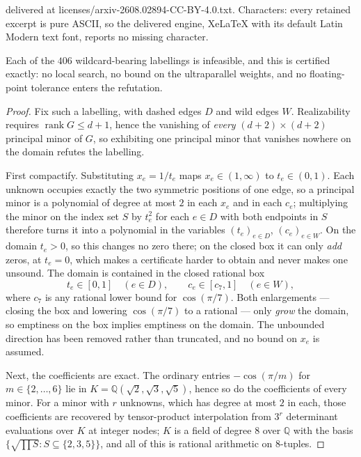 \documentclass[10pt,a4paper]{amsart}
\DeclareMathOperator{\rank}{rank}
\newcommand{\Gr}{G}
\newcommand{\NumWild}{406}
\newcommand{\QQ}{\mathbb{Q}}
\begin{document}
delivered at licenses/arxiv-2608.02894-CC-BY-4.0.txt. Characters: every retained excerpt is pure ASCII, so the delivered engine, XeLaTeX with its default Latin Modern text font, reports no missing character.
\begin{proposition}
\label{prop:wildexact}
Each of the $\NumWild$ wildcard-bearing labellings is infeasible, and this is
certified exactly: no local search, no bound on the ultraparallel weights, and no
floating-point tolerance enters the refutation.
\end{proposition}

\begin{proof}
Fix such a labelling, with dashed edges $D$ and wild edges $W$. Realizability
requires $\rank\Gr\le d+1$, hence the vanishing of \emph{every} $(d+2)\times(d+2)$
principal minor of $\Gr$, so exhibiting one principal minor that vanishes nowhere
on the domain refutes the labelling.

First compactify. Substituting $x_e = 1/t_e$ maps $x_e\in(1,\infty)$ to
$t_e\in(0,1)$. Each unknown occupies exactly the two symmetric positions of one
edge, so a principal minor is a polynomial of degree at most $2$ in each $x_e$ and
in each $c_e$; multiplying the minor on the index set $S$ by $t_e^{2}$ for each
$e\in D$ with both endpoints in $S$ therefore turns it into a polynomial in the
variables $(t_e)_{e\in D}$, $(c_e)_{e\in W}$. On the domain $t_e>0$, so this
changes no zero there; on the closed box it can only \emph{add} zeros, at
$t_e=0$, which makes a certificate harder to obtain and never makes one unsound.
The domain is contained in the closed rational box
\[
t_e\in[0,1]\quad(e\in D),\qquad c_e\in[c_7,1]\quad(e\in W),
\]
where $c_7$ is any rational lower bound for $\cos(\pi/7)$. Both enlargements ---
closing the box and lowering $\cos(\pi/7)$ to a rational --- only \emph{grow} the
domain, so emptiness on the box implies emptiness on the domain. The unbounded
direction has been removed rather than truncated, and no bound on $x_e$ is
assumed.

Next, the coefficients are exact. The ordinary entries $-\cos(\pi/m)$ for
$m\in\{2,\dots,6\}$ lie in $K=\QQ(\sqrt2,\sqrt3,\sqrt5)$, hence so do the
coefficients of every minor. For a minor with $r$ unknowns, which has degree at
most $2$ in each, those coefficients are recovered by tensor-product interpolation
from $3^{r}$ determinant evaluations over $K$ at integer nodes; $K$ is a field of
degree $8$ over $\QQ$ with the basis $\{\sqrt{\prod S}: S\subseteq\{2,3,5\}\}$, and
all of this is rational arithmetic on $8$-tuples.


\end{proof}
\end{document}
